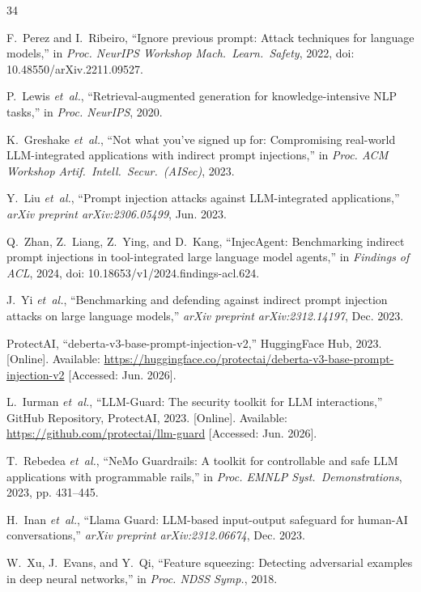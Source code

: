 ﻿\documentclass[conference]{IEEEtran}
\begin{document}
\begin{thebibliography}{34}
\footnotesize

F.~Perez and I.~Ribeiro, ``Ignore previous prompt: Attack techniques for
language models,'' in \emph{Proc. NeurIPS Workshop Mach.\ Learn.\ Safety},
2022, doi: 10.48550/arXiv.2211.09527.

P.~Lewis \emph{et~al.}, ``Retrieval-augmented generation for
knowledge-intensive NLP tasks,'' in \emph{Proc. NeurIPS}, 2020.

K.~Greshake \emph{et~al.}, ``Not what you've signed up for: Compromising
real-world LLM-integrated applications with indirect prompt injections,''
in \emph{Proc. ACM Workshop Artif.\ Intell.\ Secur.\ (AISec)}, 2023.

Y.~Liu \emph{et~al.}, ``Prompt injection attacks against LLM-integrated
applications,'' \emph{arXiv preprint arXiv:2306.05499}, Jun. 2023.

Q.~Zhan, Z.~Liang, Z.~Ying, and D.~Kang, ``InjecAgent: Benchmarking
indirect prompt injections in tool-integrated large language model agents,''
in \emph{Findings of ACL}, 2024,
doi: 10.18653/v1/2024.findings-acl.624.

J.~Yi \emph{et~al.}, ``Benchmarking and defending against indirect prompt
injection attacks on large language models,''
\emph{arXiv preprint arXiv:2312.14197}, Dec. 2023.

ProtectAI, ``deberta-v3-base-prompt-injection-v2,'' HuggingFace Hub, 2023.
[Online]. Available:
\url{https://huggingface.co/protectai/deberta-v3-base-prompt-injection-v2}
[Accessed: Jun. 2026].

L.~Iurman \emph{et~al.}, ``LLM-Guard: The security toolkit for LLM
interactions,'' GitHub Repository, ProtectAI, 2023.
[Online]. Available: \url{https://github.com/protectai/llm-guard}
[Accessed: Jun. 2026].

T.~Rebedea \emph{et~al.}, ``NeMo Guardrails: A toolkit for controllable
and safe LLM applications with programmable rails,'' in
\emph{Proc. EMNLP Syst.\ Demonstrations}, 2023, pp. 431--445.

H.~Inan \emph{et~al.}, ``Llama Guard: LLM-based input-output safeguard for
human-AI conversations,'' \emph{arXiv preprint arXiv:2312.06674}, Dec. 2023.

W.~Xu, J.~Evans, and Y.~Qi, ``Feature squeezing: Detecting adversarial
examples in deep neural networks,'' in \emph{Proc. NDSS Symp.}, 2018.


\end{thebibliography}
\end{document}
